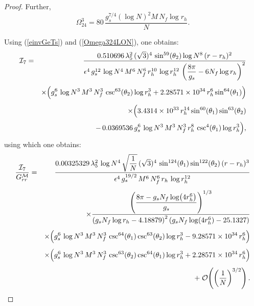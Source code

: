 \documentclass[a4paper,11pt,fleqn]{article}
\theoremstyle{plain}
\theoremstyle{definition}
\newcommand{\rh}{r_h}
\newcommand{\logN}{\log N}
\newcommand{\gsNf}{g_s N_f}
\newcommand{\logrh}{\log r_h}
\begin{document}
\begin{proof}
Further,
\begin{equation}
\label{Omega324LON}
\Omega^3_{24} = 80\,\frac{g_s^{7/4}\left(\logN\right)^2 M\,N_f\logrh}{N}.
\end{equation}

Using (\ref{einvGeTs}) and (\ref{Omega324LON}), one obtains:
%
\begin{eqnarray}
\label{I7}
\mathcal{I}_7
&=& \frac{0.510696\,\lambda_5^2\,(\sqrt{3})^4\,
          \sin^{59}\!\left(\theta_2\right)\logN^8\,
          (r-\rh)^2}
         {\epsilon^4\,g_s^{12}\,\logN^4\,M^6\,N_f^6\,
          \rh^{10}\,\logrh^{12}\,
          \left(\dfrac{8\pi}{g_s}-6N_f\logrh\right)^2}
\nonumber\\[4pt]
&& \times
   \Bigl(g_s^6\,\logN^3\,M^3\,N_f^3\,
         \csc^{63}\!\left(\theta_2\right)\logrh^3
         + 2.28571\times10^{34}\,\rh^6\sin^{64}\!\left(\theta_1\right)\Bigr)
\nonumber\\[4pt]
&& \times
   \Bigl(3.4314\times10^{33}\,\rh^{14}
         \sin^{60}\!\left(\theta_1\right)\sin^{63}\!\left(\theta_2\right)
\nonumber\\[2pt]
&& \quad
         -\,0.0369536\,g_s^6\,\logN^3\,M^3\,N_f^3\,\rh^8\,
         \csc^4\!\left(\theta_1\right)\logrh^3\Bigr),
\end{eqnarray}
%
using which one obtains:
%
\begin{eqnarray}
\label{I7overGrr}
\frac{\mathcal{I}_7}{G_{rr}^{\mathcal{M}}}
&=& \frac{0.00325329\,\lambda_5^2\,\logN^4\,
          \sqrt{\dfrac{1}{N}}\,(\sqrt{3})^4\,
          \sin^{124}\!\left(\theta_1\right)\sin^{122}\!\left(\theta_2\right)
          (r - \rh)^3}
         {\epsilon^4\,g_s^{19/2}\,M^6\,N_f^6\,\rh\,\logrh^{12}}
\nonumber\\[4pt]
&& \times
   \frac{\left(\dfrac{8\pi - \gsNf\log\!\left(4\rh^6\right)}{g_s}\right)^{1/3}}
        {\left(\gsNf\logrh - 4.18879\right)^2
         \left(\gsNf\log\!\left(4\rh^6\right) - 25.1327\right)}
\nonumber\\[4pt]
&& \times
   \Bigl(g_s^6\,\logN^3\,M^3\,N_f^3\,
         \csc^{64}\!\left(\theta_1\right)\csc^{63}\!\left(\theta_2\right)\logrh^3
         - 9.28571\times10^{34}\,\rh^6\Bigr)
\nonumber\\[4pt]
&& \times
   \Bigl(g_s^6\,\logN^3\,M^3\,N_f^3\,
         \csc^{63}\!\left(\theta_2\right)\csc^{64}\!\left(\theta_1\right)\logrh^3
         + 2.28571\times10^{34}\,\rh^6\Bigr)
\nonumber\\[4pt]
&& +\; \mathcal{O}\!\left(\left(\frac{1}{N}\right)^{3/2}\right).
\end{eqnarray}

\end{proof}
\end{document}
